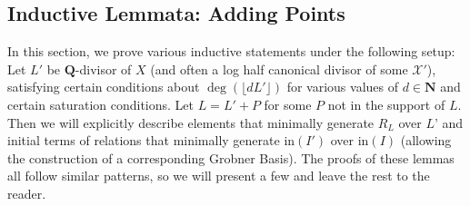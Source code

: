 \documentclass{amsart}
\theoremstyle{plain}
\theoremstyle{definition}
\theoremstyle{remark}
\numberwithin{equation}{section}
\newcommand\ssec{\subsection}
\newcommand \sx{\mathscr X}
\newcommand \halfcan{L}
\newcommand \initial{\text{in}}
\begin{document}
\ssec{Inductive Lemmata: Adding Points}
\label{ssec:add_pts}
In this section, we prove various inductive statements under the following setup:
Let $\halfcan'$ be $\mathbf{Q}$-divisor of $X$ (and often a log half canonical divisor of some $\sx'$), satisfying certain conditions about $\deg(\lfloor d \halfcan'\rfloor)$ for various values of $d\in\mathbf{N}$ and certain saturation conditions.  Let $\halfcan=\halfcan'+P$ for some $P$ not in the support of $\halfcan$.  Then we will explicitly describe elements that minimally generate $R_\halfcan$ over $\halfcan$' and initial terms of relations that minimally generate $\initial(I')$ over $\initial(I)$ (allowing the construction of a corresponding Grobner Basis).   The proofs of these lemmas all follow similar patterns, so we will present a few  and leave the rest to the reader.
\end{document}
